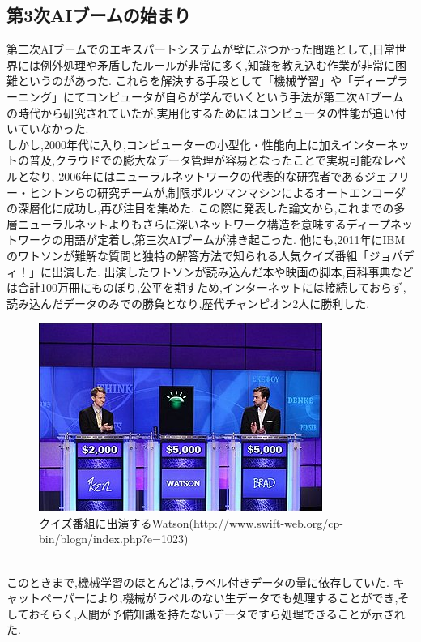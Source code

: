 \subsection{第3次AIブームの始まり}
第二次AIブームでのエキスパートシステムが壁にぶつかった問題として,日常世界には例外処理や矛盾したルールが非常に多く,知識を教え込む作業が非常に困難というのがあった.
これらを解決する手段として「機械学習」や「ディープラーニング」にてコンピュータが自らが学んでいくという手法が第二次AIブームの時代から研究されていたが,実用化するためにはコンピュータの性能が追い付いていなかった.\\
しかし,2000年代に入り,コンピューターの小型化・性能向上に加えインターネットの普及,クラウドでの膨大なデータ管理が容易となったことで実現可能なレベルとなり,
2006年にはニューラルネットワークの代表的な研究者であるジェフリー・ヒントンらの研究チームが,制限ボルツマンマシンによるオートエンコーダの深層化に成功し,再び注目を集めた.
この際に発表した論文から,これまでの多層ニューラルネットよりもさらに深いネットワーク構造を意味するディープネットワークの用語が定着し,第三次AIブームが沸き起こった.
他にも,2011年にIBMのワトソンが難解な質問と独特の解答方法で知られる人気クイズ番組「ジョパディ！」に出演した.\cite{webpage6}
出演したワトソンが読み込んだ本や映画の脚本,百科事典などは合計100万冊にものぼり,公平を期すため,インターネットには接続しておらず,読み込んだデータのみでの勝負となり,歴代チャンピオン2人に勝利した.
\begin{figure}[!ht]
    \begin{screen}
    \begin{center}
        \includegraphics[scale=1.1, clip]{./img/Watson.jpg}
        \caption{クイズ番組に出演するWatson\newline(http://www.swift-web.org/cp-bin/blogn/index.php?e=1023)}
        \label{fig:クイズ番組に出演するWatson}
    \end{center}
\end{screen}
\end{figure}\\
このときまで,機械学習のほとんどは,ラベル付きデータの量に依存していた.
キャットペーパーにより,機械がラベルのない生データでも処理することができ,そしておそらく,人間が予備知識を持たないデータですら処理できることが示された.
